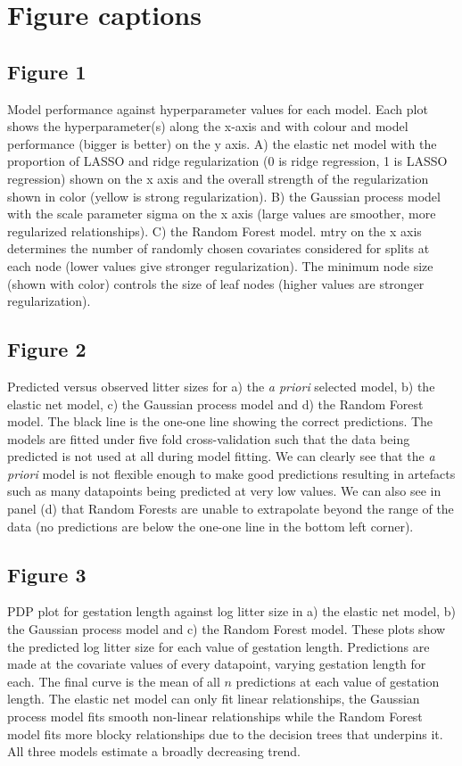\documentclass[12pt]{article}
\begin{document}
\clearpage

\section{Figure captions}
\subsection{Figure 1}
    Model performance against hyperparameter values for each model. Each plot shows the hyperparameter(s) along the x-axis and with colour and model performance (bigger is better) on the y axis. A) the elastic net model with the proportion of  LASSO and ridge regularization (0 is ridge regression, 1 is LASSO regression) shown on the x axis and the overall strength of the regularization shown in color (yellow is strong regularization).  B) the Gaussian process model with the scale parameter sigma on the x axis (large values are smoother, more regularized relationships). C) the Random Forest model. mtry on the x axis determines the number of randomly chosen covariates considered for splits at each node (lower values give stronger regularization). The minimum node size (shown with color) controls the size of leaf nodes (higher values are stronger regularization).


\subsection{Figure 2}
    Predicted versus observed litter sizes for a) the \emph{a priori} selected model, b) the elastic net model, c) the Gaussian process model and d) the Random Forest model.
    The black line is the one-one line showing the correct predictions.
    The models are fitted under five fold cross-validation such that the data being predicted is not used at all during model fitting.
    We can clearly see that the \emph{a priori} model is not flexible enough to make good predictions resulting in artefacts such as many datapoints being predicted at very low values.
    We can also see in panel (d) that Random Forests are unable to extrapolate beyond the range of the data (no predictions are below the one-one line in the bottom left corner).

\subsection{Figure 3}
    PDP plot for gestation length against log litter size in a) the elastic net model, b) the Gaussian process model and c) the Random Forest model.
    These plots show the predicted log litter size for each value of gestation length.
    Predictions are made at the covariate values of every datapoint, varying gestation length for each.
    The final curve is the mean of all $n$ predictions at each value of gestation length.
    The elastic net model can only fit linear relationships, the Gaussian process model fits smooth non-linear relationships while the Random Forest model fits more blocky relationships due to the decision trees that underpins it.
    All three models estimate a broadly decreasing trend.
\end{document}
